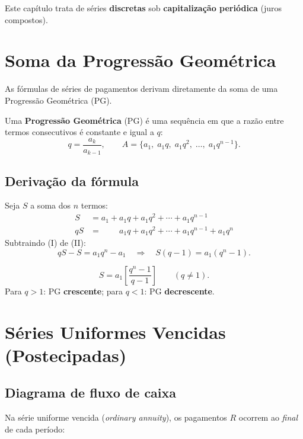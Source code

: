 \medskip
Este capítulo trata de séries \textbf{discretas} sob \textbf{capitalização periódica} (juros compostos).

\section{Soma da Progressão Geométrica}

As fórmulas de séries de pagamentos derivam diretamente da soma de uma Progressão Geométrica (PG).

\begin{definicao}
Uma \textbf{Progressão Geométrica} (PG) é uma sequência em que a razão entre termos consecutivos é constante e igual a $q$:
\[
  q = \frac{a_k}{a_{k-1}}, \qquad A = \{a_1,\; a_1 q,\; a_1 q^2,\; \ldots,\; a_1 q^{n-1}\}.
\]
\end{definicao}

\subsection*{Derivação da fórmula}

Seja $S$ a soma dos $n$ termos:
\begin{align}
  S    &= a_1 + a_1 q + a_1 q^2 + \cdots + a_1 q^{n-1}  \tag{I}  \\
  qS   &= \phantom{a_1 + {}} a_1 q + a_1 q^2 + \cdots + a_1 q^{n-1} + a_1 q^n  \tag{II}
\end{align}
Subtraindo (I) de (II):
\[
  qS - S = a_1 q^n - a_1
  \quad\Rightarrow\quad
  S(q-1) = a_1(q^n - 1).
\]

\begin{resultado}
\[
  \boxed{S = a_1 \left[\frac{q^n - 1}{q - 1}\right]}
  \qquad (q \neq 1).
\]
Para $q > 1$: PG \textbf{crescente}; \quad para $q < 1$: PG \textbf{decrescente}.
\end{resultado}

\section{Séries Uniformes Vencidas (Postecipadas)}

\subsection{Diagrama de fluxo de caixa}

Na série uniforme vencida (\textit{ordinary annuity}), os pagamentos $R$ ocorrem ao \emph{final} de cada período:

